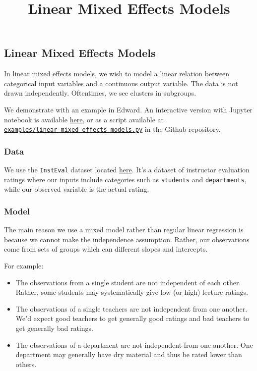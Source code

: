 \title{Linear Mixed Effects Models}

\subsection{Linear Mixed Effects Models}

In linear mixed effects models, we wish to model a linear relation between categorical input variables and a continuous output variable. The data is not drawn independently. Oftentimes, we see clusters in subgroups.

We demonstrate with an example in Edward.
An interactive version with Jupyter notebook is available
\href{http://nbviewer.jupyter.org/github/blei-lab/edward/blob/master/docs/notebooks/linear_mixed_effects_models.ipynb}{here},
or as a script available at
\href{https://github.com/blei-lab/edward/blob/master/examples/linear_mixed_effects_models.py}
{\texttt{examples/linear_mixed_effects_models.py}} in the Github repository.

\subsubsection{Data}

We use the \texttt{InstEval} dataset located \href{http://nbviewer.jupyter.org/github/blei-lab/edward/blob/master/docs/notebooks/linear_mixed_effects_models.ipynb}{here}. It's a dataset of instructor evaluation ratings where our inputs include categories such as \texttt{students} and \texttt{departments}, while our observed variable is the actual rating.

\subsubsection{Model}

The main reason we use a mixed model rather than regular linear regression is because we cannot make the independence assumption. Rather, our observations come from sets of groups which can different slopes and intercepts.

For example:
\begin{itemize}
\item The observations from a single student are not independent of each other. Rather, some students may systematically give low (or high) lecture ratings.
\item The observations of a single teachers are not independent from one another. We'd expect good teachers to get generally good ratings and bad teachers to get generally bad ratings.
\item The observations of a department are not independent from one another. One department may generally have dry material and thus be rated lower than others.
\end{itemize}

